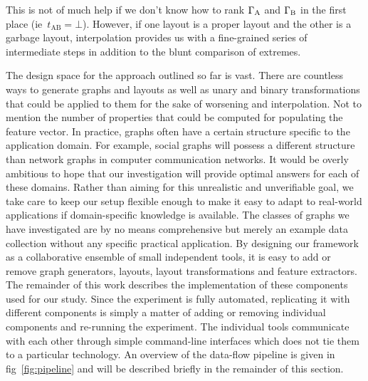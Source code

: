 \documentclass{graphstudy}
\begin{document}
This is not of much help if we don't know how to rank \(\Gamma_\mathrm{A}\) and \(\Gamma_\mathrm{B}\) in the first
place (\acs{ie}~\(t_\mathrm{AB}=\bot\)).  However, if one layout is a proper layout and the other is a garbage layout,
interpolation provides us with a fine-grained series of intermediate steps in addition to the blunt comparison of
extremes.

The design space for the approach outlined so far is vast.  There are countless ways to generate graphs and layouts as
well as unary and binary transformations that could be applied to them for the sake of worsening and interpolation.  Not
to mention the number of properties that could be computed for populating the feature vector.  In practice, graphs often
have a certain structure specific to the application domain.  For example, social graphs will possess a different
structure than network graphs in computer communication networks.  It would be overly ambitious to hope that our
investigation will provide optimal answers for each of these domains.  Rather than aiming for this unrealistic and
unverifiable goal, we take care to keep our setup flexible enough to make it easy to adapt to real-world applications if
domain-specific knowledge is available.  The classes of graphs we have investigated are by no means comprehensive but
merely an example data collection without any specific practical application.  By designing our framework as a
collaborative ensemble of small independent tools, it is easy to add or remove graph generators, layouts, layout
transformations and feature extractors.  The remainder of this work describes the implementation of these components
used for our study.  Since the experiment is fully automated, replicating it with different components is simply a
matter of adding or removing individual components and re-running the experiment.  The individual tools communicate with
each other through simple command-line interfaces which does not tie them to a particular technology.  An overview of
the data-flow pipeline is given in \acl{fig}~\ref{fig:pipeline} and will be described briefly in the remainder of this
section.

\begin{Figure}
  \begin{center}
    
  \end{center}
  \caption[Overview of the pipeline used]{%
    Overview of the pipeline used.  Circles represent data assets while rectangular boxes represent collections of
    tools.  Arrows indicate data flow (as managed by the driver script).  File names in monospace font refer to the
    configuration files that can be used to control the selection of tools to be used without modifying the driver
    script.
  }
  \label{fig:pipeline}
\end{Figure}
\end{document}
